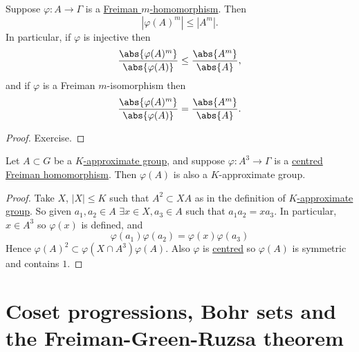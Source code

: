 \documentclass{article}
\newcommand{\named}[1]{\textbf{#1}\index{#1}}
\newcommand{\ratio}[2]{\frac{\abs{#1}}{\abs{#2}}}
\numberwithin{equation}{section}
\begin{document}
\begin{nlemma}\label{lem:4.7}
  Suppose $\varphi: A \to \Gamma$ is a \hyperlink{def:fhom}{Freiman $m$-homomorphism}.
  Then
  \begin{equation*}|\varphi(A)^m| \leq |A^m|.\end{equation*}
  In particular, if $\varphi$ is injective then
  \begin{equation*}\ratio{\varphi(A)^m}{\varphi(A)} \leq \ratio{A^m}{A},\end{equation*}
  and if $\varphi$ is a Freiman $m$-isomorphism then
  \begin{equation*}\ratio{\varphi(A)^m}{\varphi(A)} = \ratio{A^m}{A}.\end{equation*}
\end{nlemma}
\begin{proof}
  Exercise.
\end{proof}
\begin{nlemma}
  \label{lem:4.8}
  Let $A \subset G$ be a \hyperlink{def:appGroup}{$K$-approximate group}, and suppose $\varphi: A^3 \to \Gamma$ is a \hyperlink{def:fhom}{centred Freiman homomorphism}. Then $\varphi(A)$ is also a $K$-approximate group.
\end{nlemma}
\begin{proof}
  Take $X$, $|X| \leq K$ such that $A^2 \subset XA$ as in the definition of \hyperlink{def:appGroup}{$K$-approximate group}.
  So given $a_1, a_2 \in A$ $\exists x \in X, a_3 \in A$ such that $a_1 a_2 = x a_3$.
  In particular, $x \in A^3$ so $\varphi(x)$ is defined, and
  \begin{equation*}
    \varphi(a_1) \varphi(a_2) = \varphi(x) \varphi(a_3)
  \end{equation*}
  Hence $\varphi(A)^2 \subset \varphi(X \cap A^3) \varphi(A)$.
  Also $\varphi$ is \hyperlink{def:fhom}{centred} so $\varphi(A)$ is symmetric and contains $1$.
\end{proof}

\clearpage
\section{Coset progressions, Bohr sets and the Freiman-Green-Ruzsa theorem}
\end{document}
